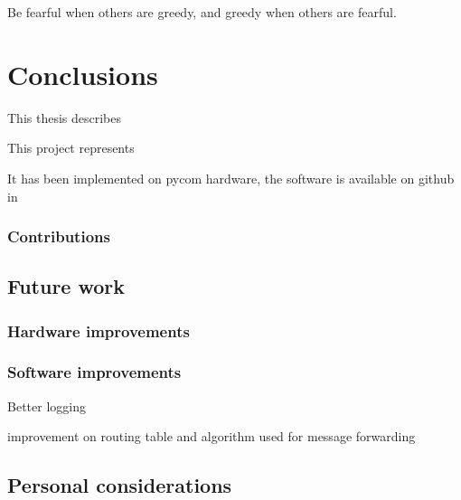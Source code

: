 
\begin{savequote}[70mm]
	Be fearful when others are greedy, and greedy when others are fearful.
\end{savequote}

\chapter{Conclusions}\label{chapter:conclusions}

	This thesis describes 
	
	This project represents
	
	It has been implemented on pycom hardware, the software is available on github in 

	\subsection{Contributions}

	\section{Future work}
	
		\subsection{Hardware improvements}
			

		\subsection{Software improvements}
		
			Better logging 
			
			improvement on routing table and algorithm used for message forwarding 

	\section{Personal considerations}
	
